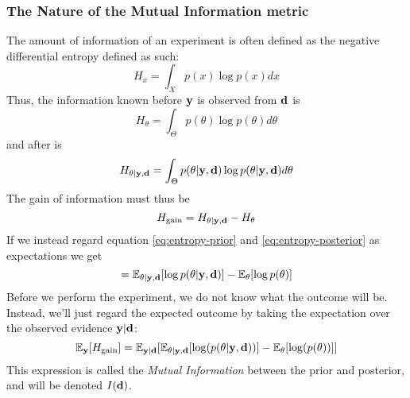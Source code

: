 \subsubsection{The Nature of the Mutual Information metric}
The amount of information of an experiment is often defined as the negative differential entropy defined as such\cite{lindley56}:
\begin{equation}H_x = \int_{X}p(x)\log p(x)dx\end{equation}
Thus, the information known before $\mathbf{y}$ is observed from $\mathbf{d}$ is
\begin{equation}\label{eq:entropy-prior}H_\theta = \int_{\Theta}p(\theta)\log p(\theta)d\theta\end{equation}
and after is
\begin{equation}\label{eq:entropy-posterior}H_{\theta | \mathbf{y}, \mathbf{d}} = \int_{\Theta}p(\theta| \mathbf{y}, \mathbf{d})\log p(\theta| \mathbf{y}, \mathbf{d})d\theta\end{equation}
The gain of information must thus be
\begin{equation}H_\textrm{gain} = H_{\theta | \mathbf{y}, \mathbf{d}} - H_\theta\end{equation}
If we instead regard equation \ref{eq:entropy-prior} and \ref{eq:entropy-posterior} as expectations we get
\begin{equation} = \mathbb{E}_{\theta | \mathbf{y}, \mathbf{d}}[\log p(\theta | \mathbf{y}, \mathbf{d})] - \mathbb{E}_\theta [\log p(\theta )]\end{equation}
Before we perform the experiment, we do not know what the outcome will be. Instead, we'll just regard the expected outcome by taking the expectation over the observed evidence $\mathbf{y} | \mathbf{d}$:
\begin{equation} \label{eq:mi-bad}\mathbb{E}_{\mathbf{y}}[H_\textrm{gain}]  = \mathbb{E}_{\mathbf{y} | \mathbf{d}}[\mathbb{E}_{\theta | \mathbf{y}, \mathbf{d}} [\log(p(\theta | \mathbf{y}, \mathbf{d}))] - \mathbb{E}_{\theta}[\log(p(\theta))]]\end{equation}
This expression is called the \textit{Mutual Information} between the prior and posterior, and will be denoted $I(\mathbf{d})$.\\
